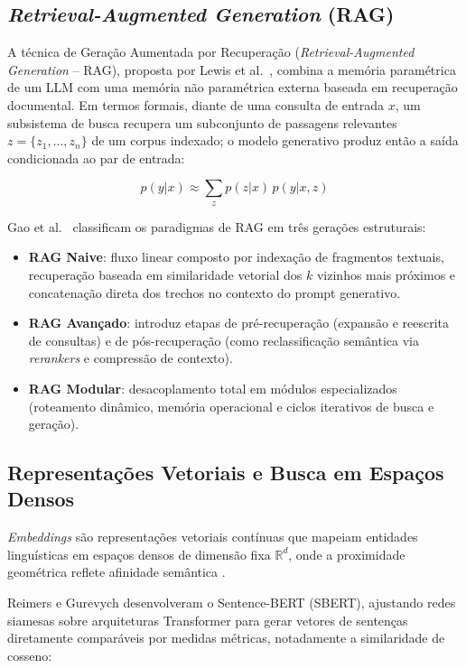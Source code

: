 \documentclass[12pt, a4paper]{article}
\begin{document}
  \subsection{\textit{Retrieval-Augmented Generation} (RAG)}
  \label{sec:rag}

  A técnica de Geração Aumentada por Recuperação (\textit{Retrieval-Augmented Generation} -- RAG), proposta por Lewis et al.\ \cite{lewis2020}, combina a memória paramétrica de um LLM com uma memória não paramétrica externa baseada em recuperação documental. Em termos formais, diante de uma consulta de entrada $x$, um subsistema de busca recupera um subconjunto de passagens relevantes $z = \{z_1, \ldots, z_n\}$ de um corpus indexado; o modelo generativo produz então a saída condicionada ao par de entrada:

$$p(y|x) \approx \sum_{z} p(z|x) \, p(y|x, z)$$

  Gao et al.\ \cite{gao2024} classificam os paradigmas de RAG em três gerações estruturais:
  \begin{itemize}
    \item \textbf{RAG Naive}: fluxo linear composto por indexação de fragmentos textuais, recuperação baseada em similaridade vetorial dos $k$ vizinhos mais próximos e concatenação direta dos trechos no contexto do prompt generativo.
    \item \textbf{RAG Avançado}: introduz etapas de pré-recuperação (expansão e reescrita de consultas) e de pós-recuperação (como reclassificação semântica via \textit{rerankers} e compressão de contexto).
    \item \textbf{RAG Modular}: desacoplamento total em módulos especializados (roteamento dinâmico, memória operacional e ciclos iterativos de busca e geração).
  \end{itemize}

  \subsection{Representações Vetoriais e Busca em Espaços Densos}
  \label{sec:embeddings}

  \textit{Embeddings} são representações vetoriais contínuas que mapeiam entidades linguísticas em espaços densos de dimensão fixa $\mathbb{R}^d$, onde a proximidade geométrica reflete afinidade semântica \cite{mikolov2013}.

  Reimers e Gurevych \cite{reimers2019} desenvolveram o Sentence-BERT (SBERT), ajustando redes siamesas sobre arquiteturas Transformer para gerar vetores de sentenças diretamente comparáveis por medidas métricas, notadamente a similaridade de cosseno:
\end{document}
